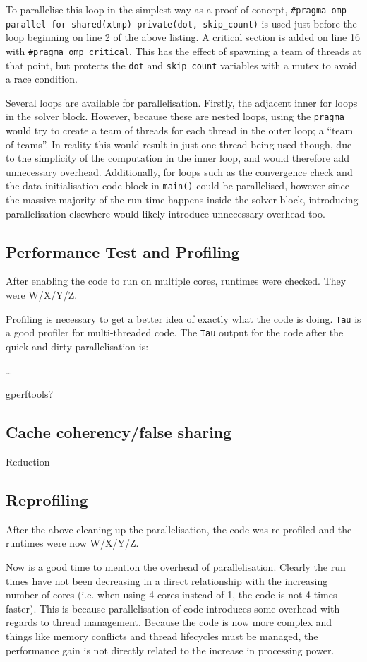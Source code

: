 \documentclass{article}
\begin{document}
To parallelise this loop in the simplest way as a proof of concept,
\texttt{\#pragma omp parallel for shared(xtmp) private(dot,
  skip\_count)} is used just before the loop beginning on line 2 of
the above listing. A critical section is added on line 16 with
\texttt{\#pragma omp critical}. This has the effect of spawning a team
of threads at that point, but protects the \texttt{dot} and
\texttt{skip\_count} variables with a mutex to avoid a race condition.

Several loops are available for parallelisation. Firstly, the adjacent
inner for loops in the solver block. However, because these are nested
loops, using the \texttt{pragma} would try to create a team of threads
for each thread in the outer loop; a ``team of teams''. In reality
this would result in just one thread being used though, due to the
simplicity of the computation in the inner loop, and would therefore
add unnecessary overhead. Additionally, for loops such as the
convergence check and the data initialisation code block in
\texttt{main()} could be parallelised, however since the massive
majority of the run time happens inside the solver block, introducing
parallelisation elsewhere would likely introduce unnecessary overhead too.

\subsection{Performance Test and Profiling}
After enabling the code to run on multiple cores, runtimes were
checked. They were W/X/Y/Z.

Profiling is necessary to get a better idea of exactly what the code
is doing. \texttt{Tau} is a good profiler for multi-threaded code. The
\texttt{Tau} output for the code after the quick and dirty
parallelisation is:

\ldots

gperftools?

\subsection{Cache coherency/false sharing}
Reduction

\subsection{Reprofiling}
After the above cleaning up the parallelisation, the code was
re-profiled and the runtimes were now W/X/Y/Z.

Now is a good time to mention the overhead of parallelisation. Clearly
the run times have not been decreasing in a direct relationship with
the increasing number of cores (i.e. when using 4 cores instead of 1,
the code is not 4 times faster). This is because parallelisation of
code introduces some overhead with regards to thread
management. Because the code is now more complex and things like
memory conflicts and thread lifecycles must be managed, the
performance gain is not directly related to the increase in processing power.
\end{document}

